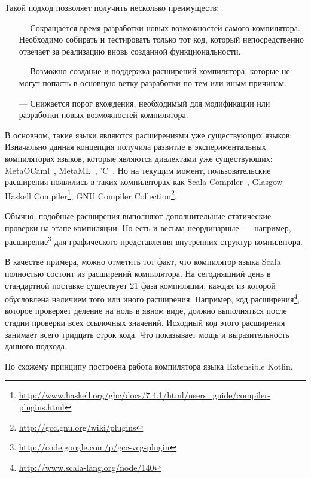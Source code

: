 Такой подход позволяет получить несколько преимуществ:
\begin{itemize}
\item[---] Сокращается время разработки новых возможностей самого компилятора. Необходимо собирать и тестировать только тот код, который непосредственно отвечает за реализацию вновь созданной функциональности.
\item[---] Возможно создание и поддержка расширений компилятора, которые не могут попасть в основную ветку разработки по тем или иным причинам.
\item[---] Снижается порог вхождения, необходимый для модификации или разработки новых возможностей компилятора.
\end{itemize}

В основном, такие языки являются расширениями уже существующих языков:
Изначально данная концепция получила развитие в экспериментальных компиляторах языков, которые являются диалектами уже существующих: MetaOCaml~\cite{metaocaml}, MetaML~\cite{metaml}, 'C~\cite{extendible-c}.
Но на текущим момент, пользовательские расширения появились в таких компиляторах как
Scala Compiler~\cite{scala-spec},
Glasgow Haskell Compiler\footnote{\url{http://www.haskell.org/ghc/docs/7.4.1/html/users_guide/compiler-plugins.html}}, GNU Compiler Collection\footnote{\url{http://gcc.gnu.org/wiki/plugins}}.

Обычно, подобные расширения выполняют дополнительные статические проверки на этапе компиляции. Но есть и весьма неординарные~--- например, расширение\footnote{\url{http://code.google.com/p/gcc-vcg-plugin}} для графического представления внутренних структур компилятора.

В качестве примера, можно отметить тот факт, что компилятор языка Scala полностью состоит из расширений компилятора. На сегодняшний день в стандартной поставке существует 21 фаза компиляции, каждая из которой обусловлена наличием того или иного расширения. Например, код расширения\footnote{\url{http://www.scala-lang.org/node/140}}, которое проверяет деление на ноль в явном виде, должно выполняться после стадии проверки всех ссылочных значений. Исходный код этого расширения занимает всего тридцать строк кода. Что показывает мощь и выразительность данного подхода.

По схожему принципу построена работа компилятора языка Extensible Kotlin.

